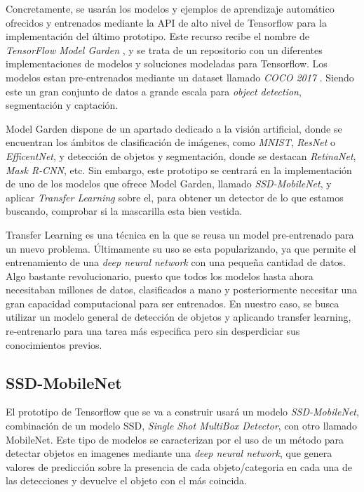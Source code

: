 Concretamente, se usarán los modelos y ejemplos de aprendizaje automático ofrecidos y entrenados mediante la API de alto nivel de Tensorflow para la implementación del último prototipo. Este recurso recibe el nombre de \textit{TensorFlow Model Garden} \cite{modelGarden}, y se trata de un repositorio con un diferentes implementaciones de modelos y soluciones modeladas para Tensorflow. Los modelos estan pre-entrenados mediante un dataset llamado \textit{COCO 2017} \cite{coco}. Siendo este un gran conjunto de datos a grande escala para \textit{object detection}, segmentación y captación.

Model Garden dispone de un apartado dedicado a la visión artificial, donde se encuentran los ámbitos de clasificación de imágenes, como \textit{MNIST}, \textit{ResNet} o \textit{EfficentNet}, y detección de objetos y segmentación, donde se destacan \textit{RetinaNet}, \textit{Mask R-CNN}, etc. Sin embargo, este prototipo se centrará en la implementación de uno de los modelos que ofrece Model Garden, llamado \textit{SSD-MobileNet}, y aplicar \textit{Transfer Learning} sobre el, para obtener un detector de lo que estamos buscando, comprobar si la mascarilla esta bien vestida.

Transfer Learning es una técnica en la que se reusa un model pre-entrenado para un nuevo problema. Últimamente su uso se esta popularizando, ya que permite el entrenamiento de una \textit{deep neural network} con una pequeña cantidad de datos. Algo bastante revolucionario, puesto que todos los modelos hasta ahora necesitaban millones de datos, clasificados a mano y posteriormente necesitar una gran capacidad computacional para ser entrenados.\cite{transferLearning} En nuestro caso, se busca utilizar un modelo general de detección de objetos y aplicando transfer learning, re-entrenarlo para una tarea más especifica pero sin desperdiciar sus conocimientos previos.

\subsection*{SSD-MobileNet}

El prototipo de Tensorflow que se va a construir usará un modelo \textit{SSD-MobileNet}, combinación de un modelo SSD, \textit{Single Shot MultiBox Detector}, con otro llamado MobileNet. Este tipo de modelos se caracterizan por el uso de un método para detectar objetos en imagenes mediante una \textit{deep neural network}, que genera valores de predicción sobre la presencia de cada objeto/categoria en cada una de las detecciones y devuelve el objeto con el más coincida.

